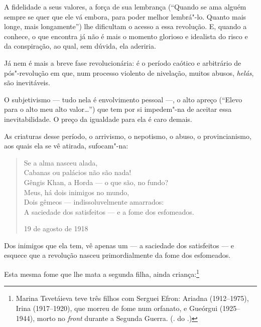A fidelidade a seus valores, a força de sua lembrança (``Quando se
ama alguém sempre se quer que ele vá embora, para poder melhor
lembrá"-lo. Quanto mais longe, mais longamente'') lhe dificultam
o acesso a essa revolução. E, quando a conhece, o que encontra já
não é mais o momento glorioso e idealista do risco e da conspiração,
ao qual, sem dúvida, ela aderiria.

Já nem é mais a breve fase revolucionária: é o período caótico e
arbitrário de pós"-revolução em que, num processo violento de nivelação,
muitos abusos, \emph{helás}, são inevitáveis.

O subjetivismo --- tudo nela é envolvimento pessoal ---, o alto apreço
(``Elevo para o alto meu alto valor\ldots{}'')
que tem por si impedem"-na de aceitar essa inevitabilidade. O preço da igualdade
para ela é caro demais.

As criaturas desse período, o arrivismo, o nepotismo, o abuso, o
provincianismo, aos quais ela se vê atirada, sufocam"-na:

\begin{verse}
Se a alma nasceu alada, \\
Cabanas ou palácios não são nada! \\
Gêngis Khan, a Horda --- o que são, no fundo? \\[8pt]
Meus, há dois inimigos no mundo, \\
Dois gêmeos --- indissoluvelmente amarrados: \\
A saciedade dos satisfeitos --- e a fome \qb{}dos esfomeados. 

19 de agosto de 1918

\end{verse}

Dos inimigos que ela tem, vê apenas um --- a saciedade dos
satisfeitos --- e esquece que a revolução nasceu primordialmente
da fome dos esfomeados.

Esta mesma fome que lhe mata a segunda filha, ainda
criança:\footnote{Marina Tsvetáieva teve três filhos com
Serguei Efron: Ariadna (1912--1975), Irina (1917--1920), que
morreu de fome num orfanato, e Gueórgui (1925--1944), morto
no \emph{front} durante a Segunda Guerra. (. do
.)}

